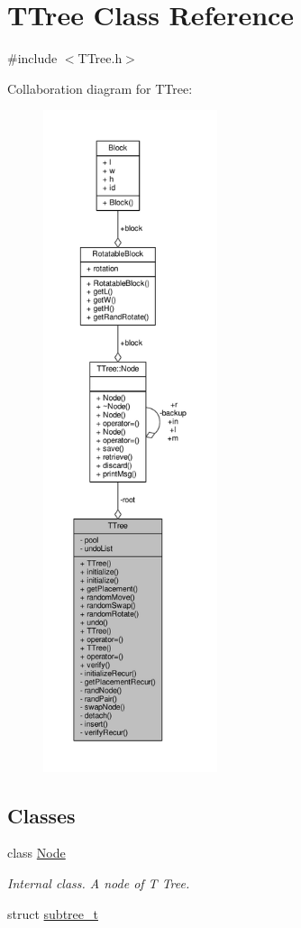 \hypertarget{classTTree}{}\section{T\+Tree Class Reference}
\label{classTTree}


{\ttfamily \#include $<$T\+Tree.\+h$>$}



Collaboration diagram for T\+Tree\+:
\nopagebreak
\begin{figure}[H]
\begin{center}
\leavevmode
\includegraphics[height=550pt]{classTTree__coll__graph}
\end{center}
\end{figure}
\subsection*{Classes}
\begin{DoxyCompactItemize}
\item 
class \hyperlink{classTTree_1_1Node}{Node}
\begin{DoxyCompactList}\small\item\em Internal class. A node of T Tree. \end{DoxyCompactList}\item 
struct \hyperlink{structTTree_1_1subtree__t}{subtree\+\_\+t}
\end{DoxyCompactItemize}
